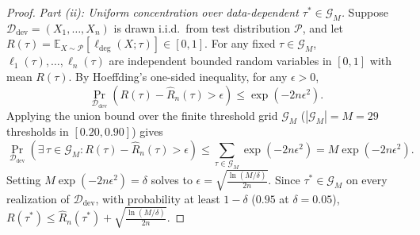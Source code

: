 \documentclass{article}
\begin{document}
\begin{proof}
\emph{Part (ii): Uniform concentration over data-dependent $\tau^* \in \mathcal{G}_M$.} Suppose $\mathcal{D}_{\mathrm{dev}} = (X_1, \dots, X_n)$ is drawn i.i.d.\ from test distribution $\mathcal{P}$, and let $R(\tau) = \mathbb{E}_{X \sim \mathcal{P}}[\ell_{\mathrm{deg}}(X; \tau)] \in [0, 1]$. For any fixed $\tau \in \mathcal{G}_M$, $\ell_1(\tau), \dots, \ell_n(\tau)$ are independent bounded random variables in $[0, 1]$ with mean $R(\tau)$. By Hoeffding's one-sided inequality, for any $\epsilon > 0$,
\begin{equation}
\Pr_{\mathcal{D}_{\mathrm{dev}}}\!\left(R(\tau) - \hat{R}_n(\tau) > \epsilon\right) \le \exp\!\left(-2n\epsilon^2\right).
\end{equation}
Applying the union bound over the finite threshold grid $\mathcal{G}_M$ ($|\mathcal{G}_M| = M = 29$ thresholds in $[0.20, 0.90]$) gives
\begin{equation}
\Pr_{\mathcal{D}_{\mathrm{dev}}}\!\left(\exists\,\tau \in \mathcal{G}_M : R(\tau) - \hat{R}_n(\tau) > \epsilon\right) \le \sum_{\tau \in \mathcal{G}_M} \exp\!\left(-2n\epsilon^2\right) = M \exp\!\left(-2n\epsilon^2\right).
\end{equation}
Setting $M \exp(-2n\epsilon^2) = \delta$ solves to $\epsilon = \sqrt{\frac{\ln(M/\delta)}{2n}}$. Since $\tau^* \in \mathcal{G}_M$ on every realization of $\mathcal{D}_{\mathrm{dev}}$, with probability at least $1 - \delta$ ($0.95$ at $\delta = 0.05$), $R(\tau^*) \le \hat{R}_n(\tau^*) + \sqrt{\frac{\ln(M/\delta)}{2n}}$.
\end{proof}
\end{document}
